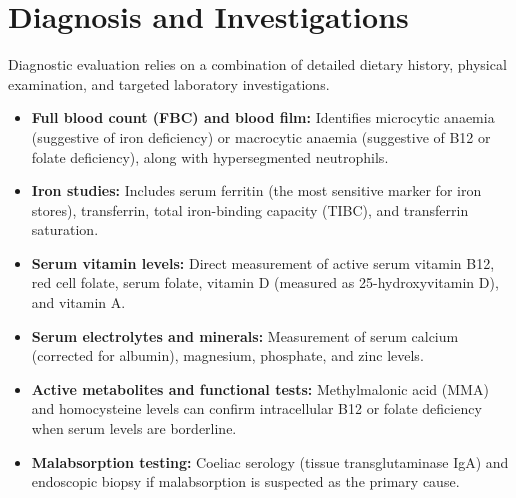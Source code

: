 \section*{Diagnosis and Investigations}
Diagnostic evaluation relies on a combination of detailed dietary history, physical examination, and targeted laboratory investigations.
\begin{itemize}
    \item \textbf{Full blood count (FBC) and blood film:} Identifies microcytic anaemia (suggestive of iron deficiency) or macrocytic anaemia (suggestive of B12 or folate deficiency), along with hypersegmented neutrophils.
    \item \textbf{Iron studies:} Includes serum ferritin (the most sensitive marker for iron stores), transferrin, total iron-binding capacity (TIBC), and transferrin saturation.
    \item \textbf{Serum vitamin levels:} Direct measurement of active serum vitamin B12, red cell folate, serum folate, vitamin D (measured as 25-hydroxyvitamin D), and vitamin A.
    \item \textbf{Serum electrolytes and minerals:} Measurement of serum calcium (corrected for albumin), magnesium, phosphate, and zinc levels.
    \item \textbf{Active metabolites and functional tests:} Methylmalonic acid (MMA) and homocysteine levels can confirm intracellular B12 or folate deficiency when serum levels are borderline.
    \item \textbf{Malabsorption testing:} Coeliac serology (tissue transglutaminase IgA) and endoscopic biopsy if malabsorption is suspected as the primary cause.
\end{itemize}

